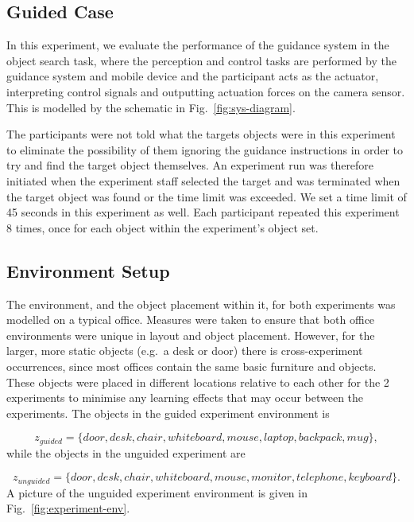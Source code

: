 \documentclass[runningheads]{llncs}
\begin{document}
\subsection{Guided Case}

In this experiment, we evaluate the performance of the guidance system in the object search task, where the perception and control tasks are performed by the guidance system and mobile device and the participant acts as the actuator, interpreting control signals and outputting actuation forces on the camera sensor. 
This is modelled by the schematic in Fig.~\ref{fig:sys-diagram}. 

The participants were not told what the targets objects were in this experiment to eliminate the possibility of them ignoring the guidance instructions in order to try and find the target object themselves.
An experiment run was therefore initiated when the experiment staff selected the target and was terminated when the target object was found or the time limit was exceeded.
We set a time limit of 45 seconds in this experiment as well.
Each participant repeated this experiment 8 times, once for each object within the experiment's object set. 

\subsection{Environment Setup}

The environment, and the object placement within it, for both experiments was modelled on a typical office.
Measures were taken to ensure that both office environments were unique in layout and object placement. 
However, for the larger, more static objects (e.g.\ a desk or door) there is cross-experiment occurrences, since most offices contain the same basic furniture and objects. 
These objects were placed in different locations relative to each other for the 2 experiments to minimise any learning effects that may occur between the experiments. 
The objects in the guided experiment environment is

\begin{equation}
  z_{guided} = \{ door, desk, chair, whiteboard, mouse, laptop, backpack, mug \},
\end{equation}
while the objects in the unguided experiment are

\begin{equation}
  z_{unguided} = \{ door, desk, chair, whiteboard, mouse, monitor, telephone, keyboard \}.
\end{equation}
A picture of the unguided experiment environment is given in Fig.~\ref{fig:experiment-env}. 
\end{document}
